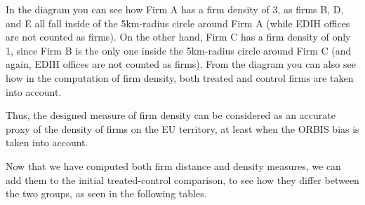 \documentclass[12pt]{report}
\begin{document}
\par In the diagram you can see how Firm A has a firm density of 3, as firms B, D, and E all fall inside of the 5km-radius circle around Firm A (while EDIH offices are not counted as firms). On the other hand, Firm C has a firm density of only 1, since Firm B is the only one inside the 5km-radius circle around Firm C (and again, EDIH offices are not counted as firms). From the diagram you can also see how in the computation of firm density, both treated and control firms are taken into account.

\par Thus, the designed measure of firm density can be considered as an accurate proxy of the density of firms on the EU territory, at least when the ORBIS bias is taken into account.

\par Now that we have computed both firm distance and density measures, we can add them to the initial treated-control comparison, to see how they differ between the two groups, as seen in the following tables.
\end{document}
